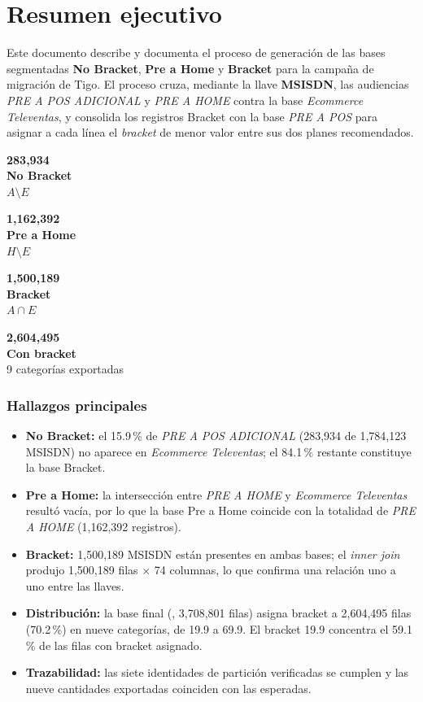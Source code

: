 \documentclass[11pt,a4paper,oneside]{book}
\DeclareRobustCommand{\cod}[1]{\texttt{\detokenize{#1}}}
\newcommand{\pct}[1]{#1\,\%}
\newcommand{\kpi}[3]{\begin{tcolorbox}[enhanced,colback=white,colframe=navy!35,boxrule=0.5pt,arc=2pt,
  borderline north={2.5pt}{0pt}{accent},left=4pt,right=4pt,top=5pt,bottom=4pt,halign=center]
  {\sffamily\bfseries\LARGE\color{navy}#1}\\[1pt]{\sffamily\small\bfseries #2}\\[-1pt]{\sffamily\scriptsize\color{graytext}#3}
  \end{tcolorbox}}
\begin{document}
\chapter*{Resumen ejecutivo}

Este documento describe y documenta el proceso de generación de las bases segmentadas \textbf{No Bracket}, \textbf{Pre a Home} y \textbf{Bracket} para la campaña de migración de Tigo. El proceso cruza, mediante la llave \textbf{MSISDN}, las audiencias \emph{PRE A POS ADICIONAL} y \emph{PRE A HOME} contra la base \emph{Ecommerce Televentas}, y consolida los registros Bracket con la base \emph{PRE A POS} para asignar a cada línea el \emph{bracket} de menor valor entre sus dos planes recomendados.

\vspace{4pt}
\begin{tcbraster}[raster columns=4,raster equal height,raster column skip=6pt,raster row skip=0pt]
\kpi{283,934}{No Bracket}{$A\setminus E$}
\kpi{1,162,392}{Pre a Home}{$H\setminus E$}
\kpi{1,500,189}{Bracket}{$A\cap E$}
\kpi{2,604,495}{Con bracket}{9 categorías exportadas}
\end{tcbraster}

\subsection*{Hallazgos principales}
\begin{itemize}
  \item \textbf{No Bracket:} el \pct{15.9} de \emph{PRE A POS ADICIONAL} (283,934 de 1,784,123 MSISDN) no aparece en \emph{Ecommerce Televentas}; el \pct{84.1} restante constituye la base Bracket.
  \item \textbf{Pre a Home:} la intersección entre \emph{PRE A HOME} y \emph{Ecommerce Televentas} resultó vacía, por lo que la base Pre a Home coincide con la totalidad de \emph{PRE A HOME} (1,162,392 registros).
  \item \textbf{Bracket:} 1,500,189 MSISDN están presentes en ambas bases; el \emph{inner join} produjo 1,500,189 filas $\times$ 74 columnas, lo que confirma una relación uno a uno entre las llaves.
  \item \textbf{Distribución:} la base final (\cod{df_final}, 3,708,801 filas) asigna bracket a 2,604,495 filas (\pct{70.2}) en nueve categorías, de 19.9 a 69.9. El bracket 19.9 concentra el \pct{59.1} de las filas con bracket asignado.
  \item \textbf{Trazabilidad:} las siete identidades de partición verificadas se cumplen y las nueve cantidades exportadas coinciden con las esperadas.
\end{itemize}
\end{document}

